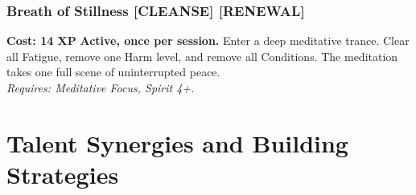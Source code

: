 \subsubsection*{Breath of Stillness \textnormal{[CLEANSE] [RENEWAL]}}
\label{talent:breath-of-stillness}
\textbf{Cost: 14 XP} \textbf{Active, once per session.} Enter a deep meditative trance. Clear all Fatigue, remove one Harm level, and remove all Conditions. The meditation takes one full scene of uninterrupted peace. \\
\textit{Requires: Meditative Focus, Spirit 4+.}

\section{Talent Synergies and Building Strategies}
\label{sec:talent-synergies}

